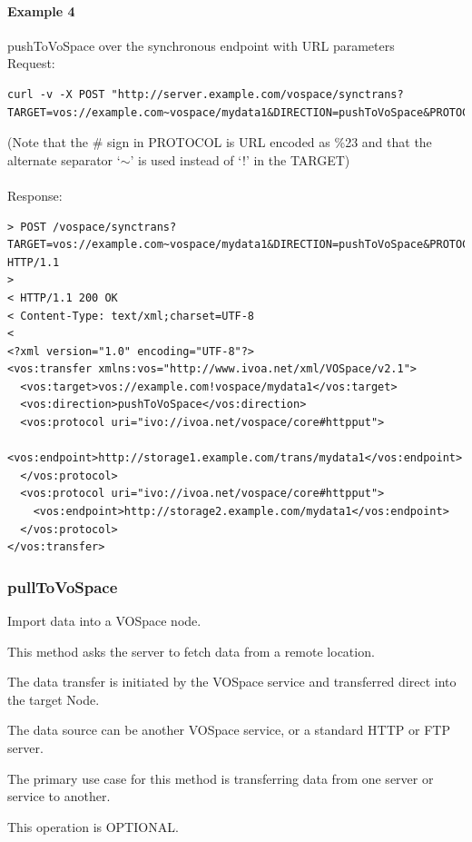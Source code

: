 \documentclass[11pt,a4paper]{ivoa}
\begin{document}
\paragraph{Example 4}
pushToVoSpace over the synchronous endpoint with URL parameters
\\[5px]
\noindent
Request:
\begin{lstlisting}
curl -v -X POST "http://server.example.com/vospace/synctrans?TARGET=vos://example.com~vospace/mydata1&DIRECTION=pushToVoSpace&PROTOCOL=ivo://ivoa.net/vospace/core%23httpput"
\end{lstlisting}
(Note that the \# sign in PROTOCOL is URL encoded as \%23 and that the alternate separator `$\mathtt{\sim}$' is used instead of `!' in the TARGET) \\
\\
Response:
\begin{lstlisting}
> POST /vospace/synctrans?TARGET=vos://example.com~vospace/mydata1&DIRECTION=pushToVoSpace&PROTOCOL=ivo://ivoa.net/vospace/core\%23httpput HTTP/1.1
>
< HTTP/1.1 200 OK
< Content-Type: text/xml;charset=UTF-8
<
<?xml version="1.0" encoding="UTF-8"?>
<vos:transfer xmlns:vos="http://www.ivoa.net/xml/VOSpace/v2.1">
  <vos:target>vos://example.com!vospace/mydata1</vos:target>
  <vos:direction>pushToVoSpace</vos:direction>
  <vos:protocol uri="ivo://ivoa.net/vospace/core#httpput">
    <vos:endpoint>http://storage1.example.com/trans/mydata1</vos:endpoint>
  </vos:protocol>
  <vos:protocol uri="ivo://ivoa.net/vospace/core#httpput">
    <vos:endpoint>http://storage2.example.com/mydata1</vos:endpoint>
  </vos:protocol>
</vos:transfer>
\end{lstlisting}

\subsubsection{pullToVoSpace}
\label{subsubsec:pulltovospace}
Import data into a VOSpace node.

This method asks the server to fetch data from a remote location.

The data transfer is initiated by the VOSpace service and transferred direct into the target Node.

The data source can be another VOSpace service, or a standard HTTP or FTP server.

The primary use case for this method is transferring data from one server or service to another.

This operation is OPTIONAL.
\end{document}
